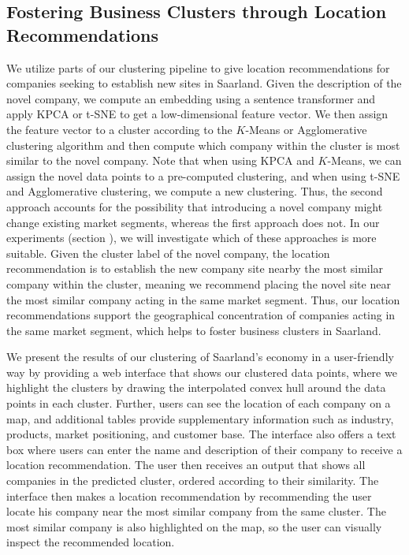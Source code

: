 \documentclass[conference]{IEEEtran}
\begin{document}
\subsection{Fostering Business Clusters through Location Recommendations}
We utilize parts of our clustering pipeline to give location recommendations for companies seeking to establish new sites in Saarland. Given the description of the novel company, we compute an embedding using a sentence transformer and apply KPCA or t-SNE to get a low-dimensional feature vector. We then assign the feature vector to a cluster according to the $K$-Means or Agglomerative clustering algorithm and then compute which company within the cluster is most similar to the novel company. Note that when using KPCA and $K$-Means, we can assign the novel data points to a pre-computed clustering, and when using t-SNE and Agglomerative clustering, we compute a new clustering.
Thus, the second approach accounts for the possibility that introducing a novel company might change existing market segments, whereas the first approach does not. In our experiments (section \MakeUppercase{}), we will investigate which of these approaches is more suitable.
Given the cluster label of the novel company, the location recommendation is to establish the new company site nearby the most similar company within the cluster, meaning we recommend placing the novel site near the most similar company acting in the same market segment. Thus, our location recommendations support the geographical concentration of companies acting in the same market segment, which helps to foster business clusters in Saarland.

We present the results of our clustering of Saarland's economy in a user-friendly way by providing a web interface that shows our clustered data points, where we highlight the clusters by drawing the interpolated convex hull around the data points in each cluster. Further, users can see the location of each company on a map, and additional tables provide supplementary information such as industry, products, market positioning, and customer base. The interface also offers a text box where users can enter the name and description of their company to receive a location recommendation. The user then receives an output that shows all companies in the predicted cluster, ordered according to their similarity. The interface then makes a location recommendation by recommending the user locate his company near the most similar company from the same cluster. The most similar company is also highlighted on the map, so the user can visually inspect the recommended location.
\end{document}
